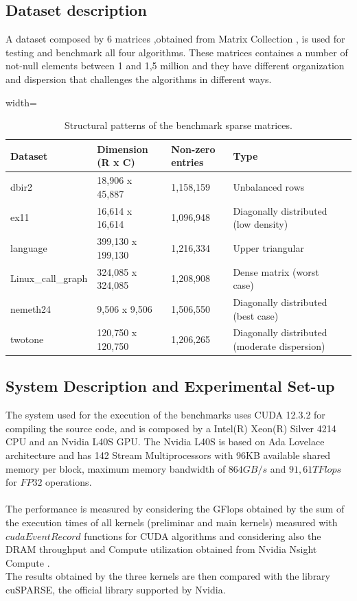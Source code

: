 \documentclass[conference]{IEEEtran}
\begin{document}
\subsection{Dataset description}
A dataset composed by 6 matrices ,obtained from Matrix Collection \cite{suitesparse}, is used for testing and benchmark all four algorithms. These matrices containes a number of not-null elements between 1 and 1,5 million and they have different organization and dispersion that challenges the algorithms in different ways. 
\begin{table}[h]
    \centering
    \begin{adjustbox}{width=\columnwidth}
    \begin{tabular}{llllrl}
    \toprule
    \textbf{Dataset} & \textbf{Dimension (R x C)} & \textbf{Non-zero entries} & \textbf{Type} \\
    \midrule
    dbir2 \cite{dbir2} & 18,906 x 45,887 & 1,158,159 & Unbalanced rows \\
    ex11 \cite{ex11} & 16,614 x 16,614 & 1,096,948  & Diagonally distributed (low density) \\
    language \cite{language} & 399,130 x 199,130 & 1,216,334 & Upper triangular \\
    Linux\_call\_graph \cite{linuxcallgraph} & 324,085 x 324,085 & 1,208,908 & Dense matrix (worst case) \\
    nemeth24 \cite{nemeth24} & 9,506 x 9,506 & 1,506,550 & Diagonally distributed (best case) \\
    twotone \cite{twotone} & 120,750 x 120,750 & 1,206,265 & Diagonally distributed (moderate dispersion) \\
    \bottomrule
    \end{tabular}
    \end{adjustbox}
    \vspace{1em}
    \caption{Structural patterns of the benchmark sparse matrices.}
    \label{tab:my_label}
\end{table}

\subsection{System Description and Experimental Set-up}
The system used for the execution of the benchmarks uses CUDA 12.3.2 for compiling the source code, and is composed by a Intel(R) Xeon(R) Silver 4214 CPU and an Nvidia L40S GPU. The Nvidia L40S is based on Ada Lovelace architecture and has 142 Stream Multiprocessors with 96KB available shared memory per block, maximum memory bandwidth of $864GB/s$ and $91,61TFlops$ for $FP32$ operations.
\\
\\
The performance is measured by considering the GFlops obtained by the sum of the execution times of all kernels (preliminar and main kernels) measured with $cudaEventRecord$ functions for CUDA algorithms and considering also the DRAM throughput and Compute utilization obtained from Nvidia Nsight Compute \cite{ncu}.
\\
The results obtained by the three kernels are then compared with the library cuSPARSE\cite{cuSPARSE}, the official library supported by Nvidia\cite{nvidia}.
\end{document}
